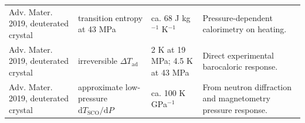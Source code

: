 \begin{longtable}{p{} p{} p{} p{}}
Adv. Mater. 2019, deuterated crystal
& transition entropy at 43 MPa
& ca. 68 J kg$^{-1}$ K$^{-1}$
& Pressure-dependent calorimetry on heating. \\

Adv. Mater. 2019, deuterated crystal
& irreversible $\Delta T_{\mathrm{ad}}$
& 2 K at 19 MPa; 4.5 K at 43 MPa
& Direct experimental barocaloric response. \\

Adv. Mater. 2019, deuterated crystal
& approximate low-pressure $\mathrm{d}T_{\mathrm{SCO}}/\mathrm{d}P$
& ca. 100 K GPa$^{-1}$
& From neutron diffraction and magnetometry pressure response. \\

\end{longtable}

